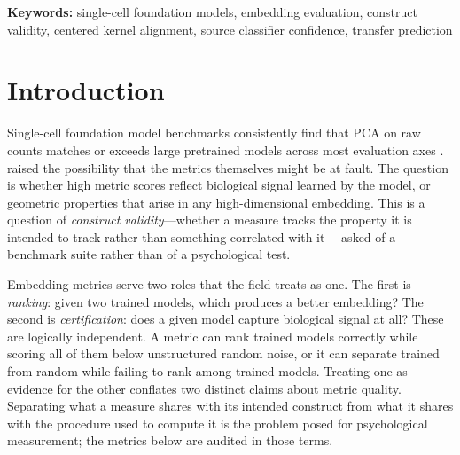 \documentclass[11pt]{article}
\begin{document}
\begin{abstract}
\textbf{Conclusions:}
Relational embedding metrics quantify geometric fidelity, which does
not capture the cluster separability that determines downstream
cell-type classification performance. SCC provides a practical
alternative for predicting cross-assay transfer, robust across
classifier families and validated against a non-classification ground
truth. Benchmark rankings derived from relational
metrics alone do not reliably reflect differences in biological signal
capture; published comparisons between foundation models and simple
baselines warrant re-evaluation with transfer-aware metrics.

\end{abstract}

\noindent\textbf{Keywords:} single-cell foundation models, embedding evaluation, construct validity, centered kernel alignment, source classifier confidence, transfer prediction

\section{Introduction}
\label{sec:intro}

Single-cell foundation model benchmarks consistently find that PCA on
raw counts matches or exceeds large pretrained models across most
evaluation axes \citep{wu2025scfm, vcbench2026, unifiedscfm2026,
cellxgeneintegration2026, chen2026harmonised, liu2026zeroshot}. \citet{wu2025scfm} raised the possibility
that the metrics themselves might be at fault. The question is whether
high metric scores reflect biological signal learned by the model, or
geometric properties that arise in any high-dimensional embedding. This is
a question of \emph{construct validity}---whether a measure tracks the
property it is intended to track rather than something correlated with
it \citep{cronbach1955construct}---asked of a benchmark suite rather than
of a psychological test.

Embedding metrics serve two roles that the field treats as one. The
first is \emph{ranking}: given two trained models, which produces a
better embedding? The second is \emph{certification}: does a given
model capture biological signal at all? These are logically independent.
A metric can rank trained models correctly while scoring all of them
below unstructured random noise, or it can separate trained from random
while failing to rank among trained models. Treating one as evidence for
the other conflates two distinct claims about metric quality. Separating
what a measure shares with its intended construct from what it shares with
the procedure used to compute it is the problem \citet{campbell1959convergent}
posed for psychological measurement; the metrics below are audited in those
terms.
\end{document}
